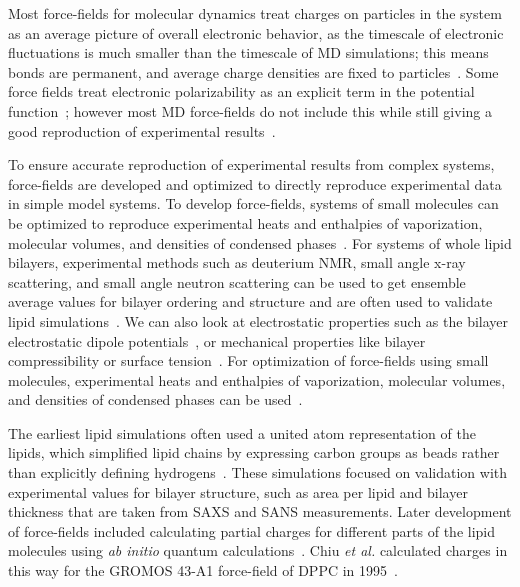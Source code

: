 \documentclass[12pt,openany,final]{book}
\newcommand{\etal}{\textit{et al.}}
\begin{document}
Most force-fields for molecular dynamics treat charges on particles in the system as an average picture of overall electronic behavior, as the
timescale of electronic fluctuations is much smaller than the timescale of MD simulations; this means bonds are permanent,
and average charge densities are fixed to particles~\cite{pandit:2008:simulationtextbook}.
Some force fields treat electronic polarizability as an explicit term in the potential function~\cite{li:2017:drude,ponder:2010:current}; however
most MD force-fields do not include this while still giving a good reproduction of experimental results~\cite{pandit:2008:simulationtextbook,chiu:2009,leonard:2018}.

To ensure accurate reproduction of experimental results from complex systems, 
force-fields are developed and optimized to directly reproduce experimental data
in simple model systems. To develop force-fields, systems of small molecules can be 
optimized to reproduce experimental heats and enthalpies of 
vaporization, molecular volumes, 
and densities of condensed phases~\cite{berger:1997,chiu:1999:optimization,chiu:2003:structure,chiu:2009}.
For systems of whole lipid bilayers, experimental methods such as deuterium NMR, small angle x-ray scattering, and small angle neutron scattering 
can be used to get ensemble average values for bilayer ordering and structure and are often used to 
validate lipid simulations~\cite{pandit:2008:simulationtextbook,fogarty:2015,chiu:2009,kruczek:2017:ether,kruczek:2017,leonard:2018,li:2017:drude,nagle:2000}.
We can also look at electrostatic properties such as the bilayer electrostatic dipole potentials~\cite{gawrisch:1992,berkowitz:2006:aqueous}, or mechanical
properties like bilayer compressibility or surface tension~\cite{kruczek:2017:ether,kruczek:2017,jahnig:1996:surface}.
For optimization of force-fields using small molecules, experimental heats and enthalpies of vaporization, molecular volumes, 
and densities of condensed phases can be used~\cite{berger:1997,chiu:1999:optimization,chiu:2003:structure,chiu:2009}.

The earliest lipid simulations often used a united atom representation of the lipids, which simplified lipid chains by expressing carbon groups
as beads rather than explicitly defining hydrogens~\cite{raghavan:1992,marrink:1993,egberts:1994}. These simulations focused on validation with experimental
values for bilayer structure, such as area per lipid and bilayer thickness that are taken from SAXS and SANS measurements. 
Later development of force-fields included calculating partial charges
for different parts of the lipid molecules using \emph{ab initio} quantum calculations~\cite{chiu:1995:incorporation,marrink:1993}. Chiu \etal
calculated charges in this way for the GROMOS 43-A1 force-field of DPPC in 1995~\cite{chiu:1995:incorporation}.
\end{document}

